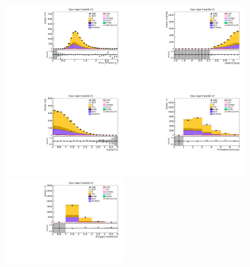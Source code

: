 \begin{figure}[tbp]
  \begin{center}
    \includegraphics[width=0.48\textwidth]{figures/wlnhbb2016/boosted/WenWHTT1bFJCR_fj1WPtBalance.pdf}
    \includegraphics[width=0.48\textwidth]{figures/wlnhbb2016/boosted/WenWHTT1bFJCR_deltaPhiVH.pdf}
    \includegraphics[width=0.48\textwidth]{figures/wlnhbb2016/boosted/WenWHTT1bFJCR_dEtal1fj1.pdf}
    \includegraphics[width=0.48\textwidth]{figures/wlnhbb2016/boosted/WenWHTT1bFJCR_nIsojet.pdf}
    \includegraphics[width=0.48\textwidth]{figures/wlnhbb2016/boosted/WenWHTT1bFJCR_isojetNBtags.pdf}

\end{center}
\end{figure}
